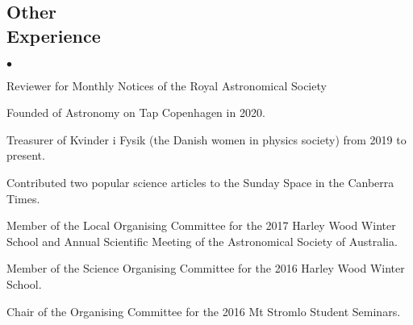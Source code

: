 \documentclass[margin,line]{res}
\newenvironment{list2}{
	\begin{list}{$\bullet$}{%
			\setlength{\itemsep}{0in}
			\setlength{\parsep}{0in} \setlength{\parskip}{0in}
			\setlength{\topsep}{0in} \setlength{\partopsep}{0in} 
			\setlength{\leftmargin}{0.2in}}}{\end{list}}
\begin{document}
\begin{resume}
		\section{\sc Other \\ Experience}
		\begin{list2}
			\item Reviewer for Monthly Notices of the Royal Astronomical Society
			\item Founded of Astronomy on Tap Copenhagen in 2020.
			\item Treasurer of Kvinder i Fysik (the Danish women in physics society) from 2019 to present.
			\item Contributed two popular science articles to the Sunday Space in the Canberra Times. 
			\item Member of the Local Organising Committee for the 2017 Harley Wood Winter School and Annual Scientific Meeting of the Astronomical Society of Australia.
			\item Member of the Science Organising Committee for the 2016 Harley Wood Winter School.
			\item Chair of the Organising Committee for the 2016 Mt Stromlo Student Seminars.
		\end{list2}
		

\end{resume}
\end{document}
